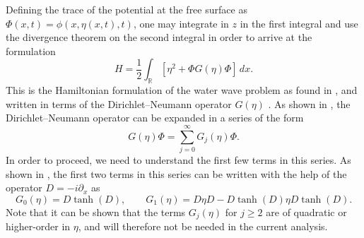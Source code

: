 %
Defining the trace of the potential at the free surface as $\Phi( x , t ) = \phi( x , \eta( x , t ), t )$, one may integrate in $z$ in the first integral and use
the divergence theorem on the second integral in order to arrive at
the formulation
%
\begin{equation}
	H  = \frac{1}{2} \int_{\mathbb{R}} \left[ \eta^2 + \Phi G(\eta) \Phi \right] \, dx.
\end{equation}
%
This is the Hamiltonian formulation of the water wave problem as
found in \citep{Craig1993, Petrov1964, Zakharov1968}, and written in terms of the Dirichlet–Neumann
operator $G (\eta)$ . As shown in \cite{Nicholls2001}, the Dirichlet–Neumann operator
can be expanded in a series of the form
%
\[
	G(\eta)\Phi = \sum_{j=0}^\infty G_j(\eta) \Phi
	.
\]
%
In order to proceed, we need to understand the first few terms in
this series. As shown in \citep{Craig1994, Craig1993}, the first two terms in this series
can be written with the help of the operator $D = -i \partial_x$ as
%
\[
	G_0(\eta)= D\tanh(D)
	, \qquad 
	G_1(\eta)= D\eta D - D\tanh(D) \eta D\tanh(D)
	. 
\]
%
Note that it can be shown that the terms $G_j (\eta)$ for $j \geq 2$ are of
quadratic or higher-order in $\eta$, and will therefore not be needed in
the current analysis.



